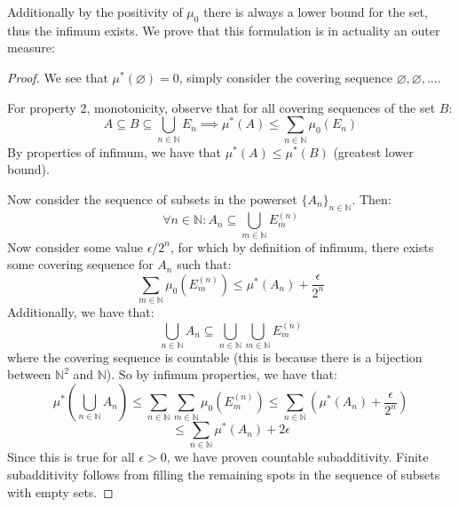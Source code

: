 \documentclass[10pt,letterpaper]{article} %
\begin{document}
Additionally by the positivity of $\mu_0$ there is always a lower bound for the set, thus the infimum exists. We prove that this formulation is in actuality an outer measure:
\begin{proof}
We see that $\mu^*(\varnothing) = 0$, simply consider the covering sequence $\varnothing, \varnothing, ...$. 

For property 2, monotonicity, observe that for all covering sequences of the set $B$:
\begin{equation*}
A \subseteq B \subseteq \bigcup_{n \in \mathbb{N}}E_n \implies \mu^*(A) \leqslant \sum_{n \in \mathbb{N}}\mu_0(E_n)
\end{equation*}
By properties of infimum, we have that $\mu^*(A) \leqslant \mu^*(B)$ (greatest lower bound).

Now consider the sequence of subsets in the powerset $\{A_n\}_{n \in \mathbb{N}}$. Then:
\begin{equation*}
\forall n \in \mathbb{N}: A_n \subseteq \bigcup_{m \in \mathbb{N}}E_m^{(n)}
\end{equation*}
Now consider some value $\epsilon/2^n$, for which by definition of infimum, there exists some covering sequence for $A_n$ such that:
\begin{equation*}
\sum_{m \in \mathbb{N}}\mu_0(E_m^{(n)}) \leqslant \mu^*(A_n) + \frac{\epsilon}{2^n}
\end{equation*}
Additionally, we have that:
\begin{equation*}
\bigcup_{n \in \mathbb{N}}A_n \subseteq \bigcup_{n \in \mathbb{N}}\bigcup_{m \in \mathbb{N}}E_m^{(n)}
\end{equation*}
where the covering sequence is countable (this is because there is a bijection between $\mathbb{N}^2$ and $\mathbb{N}$). So by infimum properties, we have that:
\begin{equation*}
\mu^*\left(\bigcup_{n \in \mathbb{N}}A_n\right) \leqslant \sum_{n \in \mathbb{N}}\sum_{m \in \mathbb{N}}\mu_0(E_m^{(n)}) \leqslant \sum_{n \in \mathbb{N}}\left(\mu^*(A_n) + \frac{\epsilon}{2^n}\right)
\end{equation*}
\begin{equation*}
\leqslant \sum_{n \in \mathbb{N}}\mu^*(A_n) + 2\epsilon
\end{equation*}
Since this is true for all $\epsilon > 0$, we have proven countable subadditivity. Finite subadditivity follows from filling the remaining spots in the sequence of subsets with empty sets.
\end{proof}
\end{document}
